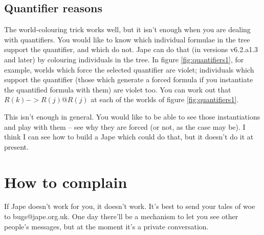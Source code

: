 \documentclass[11pt]{article}
\begin{document}
\subsection{Quantifier reasons}

The world-colouring trick works well, but it isn't enough when you are dealing with quantifiers. You would like to know which individual formulae in the tree support the quantifier, and which do not. Jape can do that (in versions v6.2.a1.3 and later) by colouring individuals in the tree. In figure \ref{fig:quantifiers1}, for example, worlds which force the selected quantifier are violet; individuals which support the quantifier (those which generate a forced formula if you instantiate the quantified formula with them) are violet too. You can work out that $R(k)->R(j)@R(j)$ at each of the worlds of figure \ref{fig:quantifiers1}.

This isn't enough in general. You would like to be able to see those instantiations and play with them -- see why they are forced (or not, as the case may be). I think I can see how to build a Jape which could do that, but it doesn't do it at present.

\section*{How to complain}

If Jape doesn't work for you, it doesn't work. It's best to send your tales of woe to bugs@jape.org.uk. One day there'll be a mechanism to let you see other people's messages, but at the moment it's a private conversation.
\end{document}
